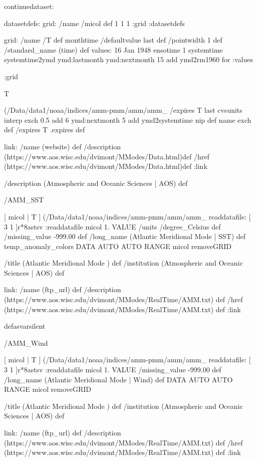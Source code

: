 \begin{ingrid}

continuedataset:

datasetdefs:
grid:
/name /micol def
1 1 1
:grid
:datasetdefs

    grid:
      /name /T def
      monthtime
      /defaultvalue { last } def
      /pointwidth 1 def
       /standard_name (time) def
      values:
        16 Jan 1948 ensotime
        1
        systemtime
        systemtime2ymd
        ymd:lastmonth
        ymd:nextmonth 15 add
        ymd2rm1960
        {} for
      :values

    :grid

T { (/Data/data1/noaa/indices/amm-pmm/amm/amm_%
/expires
  T last cvsunits
    interp exch
     0.5 add
     6 ymd:nextmonth
      5 add
      ymd2systemtime
      nip
def
  name exch def
/expires T .expires  def


link:
  /name (website) def
  /description (https://www.aos.wisc.edu/dvimont/MModes/Data.html)def
  /href (https://www.aos.wisc.edu/dvimont/MModes/Data.html)def
:link


/description (Atmospheric and Oceanic Sciences |  AOS) def


/AMM_SST {
 [ micol | T  ]
  (/Data/data1/noaa/indices/amm-pmm/amm/amm_%
 readdatafile:
  [ 3 1 ]r*8astsv
 :readdatafile
   micol 1. VALUE
   /units /degree_Celsius def
   /missing_value -999.00 def 
   /long_name (Atlantic Meridional Mode | SST) def
   temp_anomaly_colors
   DATA AUTO AUTO RANGE
   micol removeGRID

 /title (Atlantic Meridional Mode ) def
 /institution (Atmospheric and Oceanic Sciences |  AOS) def

 link:
  /name (ftp_url) def
  /description (https://www.aos.wisc.edu/dvimont/MModes/RealTime/AMM.txt) def
  /href (https://www.aos.wisc.edu/dvimont/MModes/RealTime/AMM.txt) def
 :link

}defasvarsilent

/AMM_Wind {
 [ micol | T  ]
  (/Data/data1/noaa/indices/amm-pmm/amm/amm_%
 readdatafile:
  [ 3 1 ]r*8astsv
 :readdatafile
   micol 1. VALUE
   /missing_value -999.00 def
   /long_name (Atlantic Meridional Mode | Wind) def
   DATA AUTO AUTO RANGE
   micol removeGRID

 /title (Atlantic Meridional Mode ) def
 /institution (Atmospheric and Oceanic Sciences |  AOS) def

 link:
  /name (ftp_url) def
  /description (https://www.aos.wisc.edu/dvimont/MModes/RealTime/AMM.txt) def
  /href (https://www.aos.wisc.edu/dvimont/MModes/RealTime/AMM.txt) def
 :link

}}
\end{ingrid}
